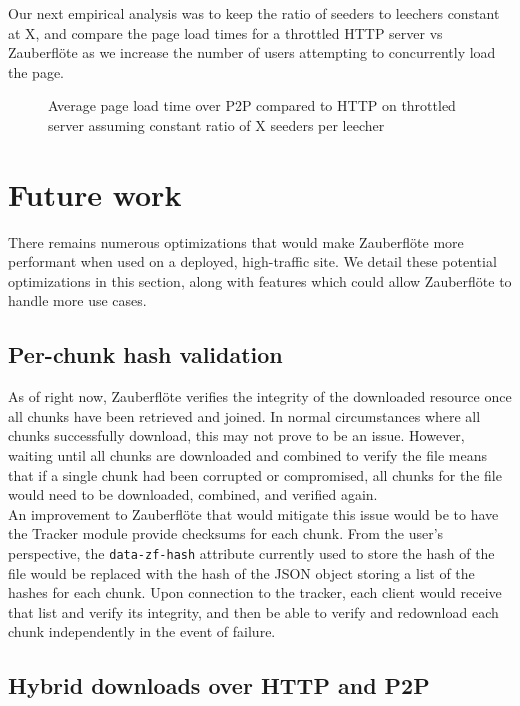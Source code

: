 \documentclass[letterpaper,twocolumn,10pt]{article}
\newcommand{\zbf}{Zauberfl\"{o}te\xspace}
\begin{document}
Our next empirical analysis was to keep the ratio of seeders to leechers constant at X,
and compare the page load times for a throttled HTTP server vs \zbf as we increase the
number of users attempting to concurrently load the page.

\begin{figure}[h]
\caption{Average page load time over P2P compared to HTTP on throttled server assuming
constant ratio of X seeders per leecher}
\end{figure}


\section{Future work}

There remains numerous optimizations that would make \zbf more performant
when used on a deployed, high-traffic site. We detail these potential optimizations
in this section, along with features which could allow \zbf to handle more use cases.

\subsection{Per-chunk hash validation}
As of right now, \zbf verifies the integrity of the downloaded resource once all
chunks have been retrieved and joined. In normal circumstances where all chunks
successfully download, this may not prove to be an issue. However, waiting until
all chunks are downloaded and combined to verify the file means that if a single
chunk had been corrupted or compromised, all chunks for the file would need to be
downloaded, combined, and verified again. \\

An improvement to \zbf that would mitigate this issue would be to have the Tracker
module provide checksums for each chunk. From the user's perspective, the
\texttt{data-zf-hash} attribute currently used to store the hash of the file
would be replaced with the hash of the JSON object storing a list of the hashes
for each chunk. Upon connection to the tracker, each client would receive that
list and verify its integrity, and then be able to verify and redownload each chunk
independently in the event of failure.

\subsection{Hybrid downloads over HTTP and P2P}
\end{document}
